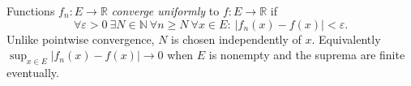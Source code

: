 
Functions $f_n:E\to\mathbb R$ \emph{converge uniformly} to $f:E\to\mathbb R$ if
\[
\forall\varepsilon>0\ \exists N\in\mathbb N\
\forall n\ge N\ \forall x\in E:\ |f_n(x)-f(x)|<\varepsilon.
\]
Unlike pointwise convergence, $N$ is chosen independently of $x$. Equivalently $\sup_{x\in E}|f_n(x)-f(x)|\to0$ when $E$ is nonempty and the suprema are finite eventually.
